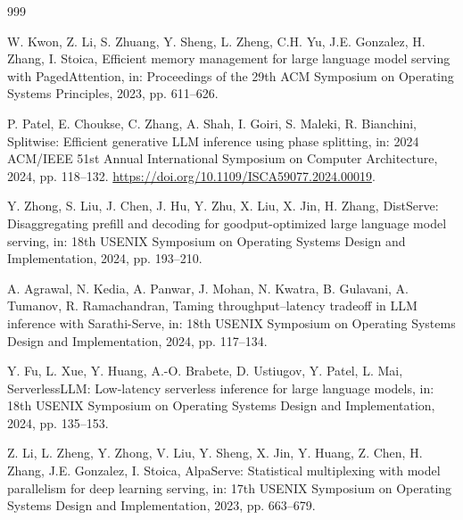 \documentclass[futureinternet,article,submit,moreauthors]{Definitions/mdpi}
\begin{document}



\begin{thebibliography}{999}

W. Kwon, Z. Li, S. Zhuang, Y. Sheng, L. Zheng, C.H. Yu, J.E. Gonzalez, H. Zhang, I. Stoica,
Efficient memory management for large language model serving with PagedAttention,
in: Proceedings of the 29th ACM Symposium on Operating Systems Principles, 2023, pp. 611--626.

P. Patel, E. Choukse, C. Zhang, A. Shah, I. Goiri, S. Maleki, R. Bianchini,
Splitwise: Efficient generative LLM inference using phase splitting,
in: 2024 ACM/IEEE 51st Annual International Symposium on Computer Architecture, 2024, pp. 118--132.
\newblock \url{https://doi.org/10.1109/ISCA59077.2024.00019}.

Y. Zhong, S. Liu, J. Chen, J. Hu, Y. Zhu, X. Liu, X. Jin, H. Zhang,
DistServe: Disaggregating prefill and decoding for goodput-optimized large language model serving,
in: 18th USENIX Symposium on Operating Systems Design and Implementation, 2024, pp. 193--210.

A. Agrawal, N. Kedia, A. Panwar, J. Mohan, N. Kwatra, B. Gulavani, A. Tumanov, R. Ramachandran,
Taming throughput--latency tradeoff in LLM inference with Sarathi-Serve,
in: 18th USENIX Symposium on Operating Systems Design and Implementation, 2024, pp. 117--134.

Y. Fu, L. Xue, Y. Huang, A.-O. Brabete, D. Ustiugov, Y. Patel, L. Mai,
ServerlessLLM: Low-latency serverless inference for large language models,
in: 18th USENIX Symposium on Operating Systems Design and Implementation, 2024, pp. 135--153.

Z. Li, L. Zheng, Y. Zhong, V. Liu, Y. Sheng, X. Jin, Y. Huang, Z. Chen, H. Zhang, J.E. Gonzalez, I. Stoica,
AlpaServe: Statistical multiplexing with model parallelism for deep learning serving,
in: 17th USENIX Symposium on Operating Systems Design and Implementation, 2023, pp. 663--679.


\end{thebibliography}
\end{document}
